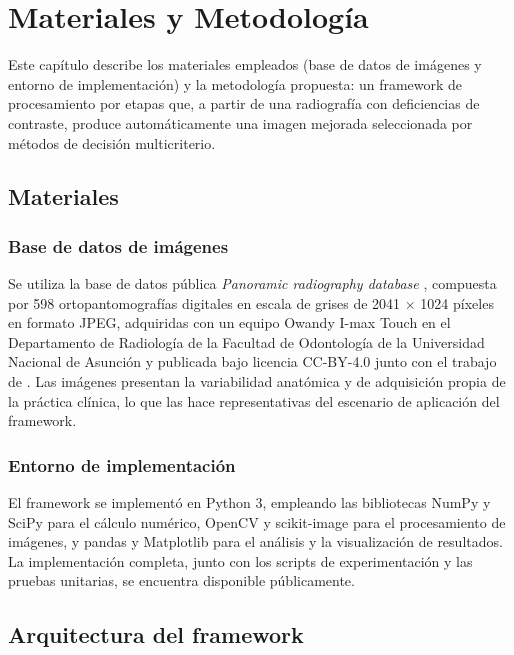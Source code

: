 \chapter{Materiales y Metodología} %
\label{Chapter4}

Este capítulo describe los materiales empleados (base de datos de imágenes y entorno de implementación) y la metodología propuesta: un framework de procesamiento por etapas que, a partir de una radiografía con deficiencias de contraste, produce automáticamente una imagen mejorada seleccionada por métodos de decisión multicriterio.

\section{Materiales}

\subsection{Base de datos de imágenes}

Se utiliza la base de datos pública \textit{Panoramic radiography database} \citep{Fretes2021}, compuesta por 598 ortopantomografías digitales en escala de grises de 2041 $\times$ 1024 píxeles en formato JPEG, adquiridas con un equipo Owandy I-max Touch en el Departamento de Radiología de la Facultad de Odontología de la Universidad Nacional de Asunción y publicada bajo licencia CC-BY-4.0 junto con el trabajo de \citet{MelloRoman2021}. Las imágenes presentan la variabilidad anatómica y de adquisición propia de la práctica clínica, lo que las hace representativas del escenario de aplicación del framework.

\subsection{Entorno de implementación}

El framework se implementó en Python 3, empleando las bibliotecas NumPy y SciPy para el cálculo numérico, OpenCV y scikit-image para el procesamiento de imágenes, y pandas y Matplotlib para el análisis y la visualización de resultados. La implementación completa, junto con los scripts de experimentación y las pruebas unitarias, se encuentra disponible públicamente.

\section{Arquitectura del framework}
\label{sec:arquitectura}

